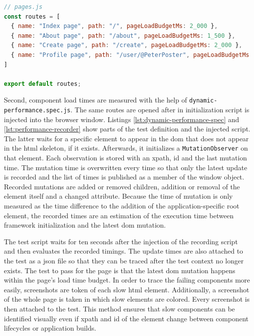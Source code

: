 \documentclass[a4paper, 10pt]{article}
\begin{document}
\begin{lstlisting}[caption={Test pages configuration}, label={lst:pages-config}, language=JavaScript]
// pages.js
const routes = [
  { name: "Index page", path: "/", pageLoadBudgetMs: 2_000 },
  { name: "About page", path: "/about", pageLoadBudgetMs: 1_500 },
  { name: "Create page", path: "/create", pageLoadBudgetMs: 2_000 },
  { name: "Profile page", path: "/user/@PeterPoster", pageLoadBudgetMs: 2_000 },
]

export default routes;
\end{lstlisting}

Second, component load times are measured with the help of \verb|dynamic-performance.spec.js|.
The same routes are opened after in initialization script is injected into the browser window.
Listings \ref{lst:dynamic-performance-spec} and \ref{lst:performance-recorder} show parts of the test definition and the injected script.
The latter waits for a specific element to appear in the \acrshort{dom} that does not appear in the \acrshort{html} skeleton, if it exists. %
Afterwards, it initializes a \verb|MutationObserver| on that element.
Each observation is stored with an xpath, id and the last mutation time.
The mutation time is overwritten every time so that only the latest update is recorded and the list of times is published as a member of the window object.
Recorded mutations are added or removed children, addition or removal of the element itself and a changed attribute.
Because the time of mutation is only measured as the time difference to the addition of the application-specific root element, the recorded times are an estimation of the execution time between framework initialization and the latest \acrshort{dom} mutation.

The test script waits for ten seconds after the injection of the recording script and then evaluates the recorded timings.
The update times are also attached to the test as a \acrshort{json} file so that they can be traced after the test context no longer exists.
The test to pass for the page is that the latest \acrshort{dom} mutation happens within the page's load time budget.
In order to trace the failing components more easily, screenshots are token of each slow \acrshort{html} element.
Additionally, a screenshot of the whole page is taken in which slow elements are colored. Every screenshot is then attached to the test.
This method ensures that slow components can be identified visually even if xpath and id of the element change between component lifecycles or application builds.
\end{document}
